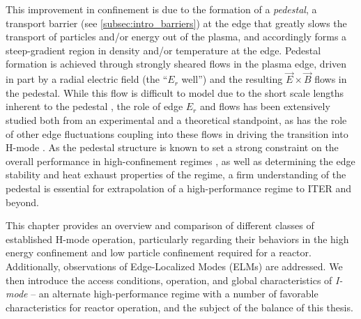 This improvement in confinement is due to the formation of a \emph{pedestal}, a transport barrier (see \cref{subsec:intro_barriers}) at the edge that greatly slows the transport of particles and/or energy out of the plasma, and accordingly forms a steep-gradient region in density and/or temperature at the edge.  Pedestal formation is achieved through strongly sheared flows in the plasma edge, driven in part by a radial electric field (the ``$E_r$ well'') and the resulting $\vec{E} \times \vec{B}$ flows in the pedestal.  While this flow is difficult to model due to the short scale lengths inherent to the pedestal \cite{Kagan2010,Landreman2012}, the role of edge $E_r$ and flows has been extensively studied both from an experimental \cite{Groebner1990,Burrell1999,Terry2000,McDermott2009a} and a theoretical \cite{Shaing1989,Biglari1990,Kim1991,Ware1996,Burrell1992} standpoint, as has the role of other edge fluctuations coupling into these flows in driving the transition into H-mode \cite{Schmitz2012}.  As the 
pedestal structure is known to set a strong constraint on the overall performance in high-confinement regimes \cite{Kinsey2011}, as well as determining the edge stability and heat exhaust properties of the regime, a firm understanding of the pedestal is essential for extrapolation of a high-performance regime to ITER and beyond.

This chapter provides an overview and comparison of different classes of established H-mode operation, particularly regarding their behaviors in the high energy confinement and low particle confinement required for a reactor.  Additionally, observations of Edge-Localized Modes (ELMs) \cite{Zohm1996} are addressed.  We then introduce the access conditions, operation, and global characteristics of \emph{I-mode} -- an alternate high-performance regime with a number of favorable characteristics for reactor operation, and the subject of the balance of this thesis.

